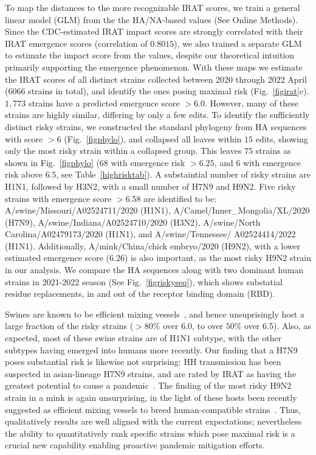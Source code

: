 \documentclass[onecolumn, compsoc,10pt]{IEEEtran}
\def\METHODS{Online Methods\xspace}
\begin{document}
To map the \enet distances to the more recognizable IRAT scores, we  train a general linear model (GLM)  from the  the HA/NA-based \erisk values (See \METHODS). Since the CDC-estimated IRAT impact scores are strongly correlated with their IRAT emergence scores (correlation of $0.8015$), we also trained a separate GLM to estimate the impact score from the \erisk values, despite our theoretical intuition primarily supporting the emergence phenomenon.  With these  maps  we estimate the  IRAT scores of all distinct \infl strains collected between 2020 through 2022 April ($6066$ strains in total), and identify the ones posing maximal risk (Fig.~\ref{figirat}c). $1,773$ strains have a predicted emergence score $>6.0$. However, many of these strains are highly similar, differing by only a few edits. To identify the sufficiently distinct risky strains, we constructed the standard phylogeny from  HA sequences with score $>6$ (Fig.~\ref{figphylo}), and collapsed all leaves within $15$ edits, showing only the most risky strain within a collapsed group. This leaves $75$ strains as shown in Fig.~\ref{figphylo} (68 with emergence risk $>6.25$, and $6$ with emergence risk above $6.5$, see Table~\ref{highrisktab}). A substaintial number of   risky strains are H1N1, followed by H3N2, with a  small number of H7N9 and H9N2. Five risky strains with emergence score $>6.58$ are identified to be: 
A/swine/Missouri/A02524711/2020 (H1N1), A/Camel/Inner\_Mongolia/XL/2020 (H7N9), A/swine/Indiana/A02524710/2020 (H3N2), A/swine/North Carolina/A02479173/2020 (H1N1), and A/swine/Tennessee/ A02524414/2022 (H1N1).  Additionally,  A/mink/China/chick embryo/2020 (H9N2),  with a lower estimated emergence score ($6.26$) is also important, as the most risky H9N2 strain in our analysis. We compare the HA sequences along with two dominant human strains in 2021-2022 season (See Fig.~\ref{figriskyseq}), which shows substatial residue replacements, in and out of the receptor binding domain (RBD).


Swines are known to be efficient mixing vessels~\cite{ma2009pig,nelson2018origins,reid2003origin,Baumann}, and hence unsuprisingly host a large fraction of the risky strains ($>80\%$ over 6.0, to over $50\%$ over 6.5). Also, as  expected, most of these swine strains are of  H1N1 subtype, with the other subtypes  having emerged into humans more recently. Our finding that a H7N9 poses substantial risk is likewise not surprising:
HH transmission has been suspected in asian-lineage H7N9 strains, and are rated by IRAT as having the greatest potential to cause a pandemic~\cite{qi2013probable}. The finding of  the most risky H9N2 strain in a mink is again unsurprising, in the light of these hosts  been recently suggested as efficient mixing vessels to breed human-compatible strains~\cite{sun2021mink}. Thus,  qualitatively results  are well aligned with the current expectations; nevertheless the ability to quantitatively rank  specific strains which pose maximal risk is a crucial new capability enabling proactive pandemic mitigation efforts.
\end{document}
